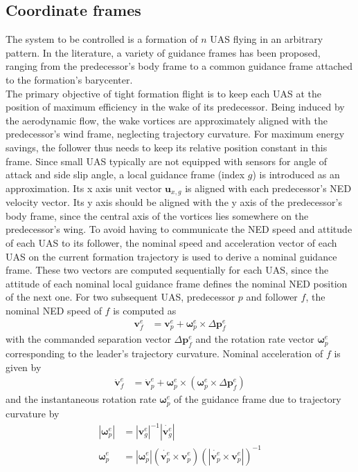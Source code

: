 \documentclass{ifacconf}
\newcommand{\mbf}[1]{\mathbf{#1}}
\providecommand{\mbf}[1]{\mathbf{#1}}
\begin{document}
\subsection{Coordinate frames}
The system to be controlled is a formation of $n$ UAS flying in an arbitrary pattern. In the literature, a variety of guidance frames has been proposed, ranging from the predecessor's body frame to a common guidance frame attached to the formation's barycenter.\\
The primary objective of tight formation flight is to keep each UAS at the position of maximum efficiency in the wake of its predecessor.
Being induced by the aerodynamic flow, the wake vortices are approximately aligned with the predecessor's wind frame, neglecting trajectory curvature. 
For maximum energy savings, the follower thus needs to keep its relative position constant in this frame. Since small UAS typically are not equipped with sensors for angle of attack and side slip angle, a local guidance frame (index $g$) is introduced as an approximation. Its x axis unit vector $\mbf{u}_{x,g}$ is aligned with each predecessor's NED velocity vector. Its y axis should be aligned with the y axis of the predecessor's body frame, since the central axis of the vortices lies somewhere on the predecessor's wing.
To avoid having to communicate the NED speed and attitude of each UAS to its follower, the nominal speed and acceleration vector of each UAS on the current formation trajectory is used to derive a nominal guidance frame.
These two vectors are computed sequentially for each UAS, since the attitude of each nominal local guidance frame defines the nominal NED position of the next one.
For two subsequent UAS, predecessor $p$ and follower $f$, the nominal NED speed of $f$ is computed as
\begin{align}
\mbf{v}_f^e &= \mbf{v}_p^e + \mbf{\omega}_p^e \times \Delta \mbf{p}_f^e 
\end{align}
with the commanded separation vector $\Delta \mbf{p}_f^e$ and the rotation rate vector $\mbf{\omega}_p^e$ corresponding to the leader's trajectory curvature. Nominal acceleration of $f$ is given by
\begin{align}
\dot{\mbf{v}}_f^e &= \dot{\mbf{v}}_p^e + \mbf{\omega}_p^e \times (\mbf{\omega}_p^e \times \Delta \mbf{p}^e_f)
\end{align}
and the instantaneous rotation rate $\mbf{\omega}_p^e$ of the guidance frame due to trajectory curvature by
\begin{align}
|\mbf{\omega}_p^e| &= {|{\mbf{v}_g^e}|}^{-1}{|\dot{\mbf{v}_g^e}|}\\
\mbf{\omega}_p^e &= 
|\mbf{\omega}_p^e| 
({\dot{\mbf{v}_p^e} \times \mbf{v}_p^e})({|\dot{\mbf{v}_p^e} \times \mbf{v}_p^e|})^{-1}
\end{align}
\end{document}
